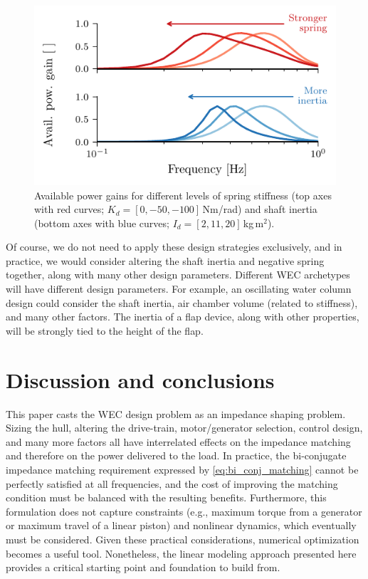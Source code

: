 \documentclass[lettersize,journal]{IEEEtran}
\begin{document}
\begin{figure}[tb]
        \centering
        \includegraphics[width=1\columnwidth]{wec_as_multiport_spring_inertia_transducer_gains.pdf}
        \caption{Available power gains for different levels of spring stiffness (top axes with red curves; $K_d=[0, -50, -100]$\,Nm/rad) and shaft inertia (bottom axes with blue curves; $I_d=[2, 11, 20]$\,kg\,m$^2$).}
        \label{fig:wec_as_multiport_spring_inertia_transducer_gains}
\end{figure}

Of course, we do not need to apply these design strategies exclusively, and in practice, we would consider altering the shaft inertia and negative spring together, along with many other design parameters.
Different WEC archetypes will have different design parameters.
For example, an oscillating water column design could consider the shaft inertia, air chamber volume (related to stiffness), and many other factors.
The inertia of a flap device, along with other properties, will be strongly tied to the height of the flap.

\section{Discussion and conclusions}
This paper casts the WEC design problem as an impedance shaping problem.
Sizing the hull, altering the drive-train, motor/generator selection, control design, and many more factors all have interrelated effects on the impedance matching and therefore on the power delivered to the load.
In practice, the bi-conjugate impedance matching requirement expressed by \eqref{eq:bi_conj_matching} cannot be perfectly satisfied at all frequencies, and the cost of improving the matching condition must be balanced with the resulting benefits.
Furthermore, this formulation does not capture constraints (e.g., maximum torque from a generator or maximum travel of a linear piston) and nonlinear dynamics, which eventually must be considered.
Given these practical considerations, numerical optimization becomes a useful tool.
Nonetheless, the linear modeling approach presented here provides a critical starting point and foundation to build from.
\end{document}
